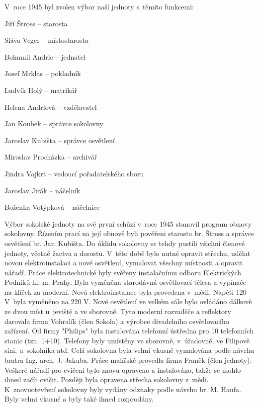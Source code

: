 \documentclass[a5paper, 11pt, twoside]{article}
\begin{document}
\medskip
\noindent V~roce 1945 byl zvolen výbor naší jednoty s~těmito funkcemi:

\noindent Jiří Štross -- starosta

\noindent Sláva Veger -- místostarosta

\noindent Bohumil Andrle -- jednatel

\noindent Josef Mrklas -- pokladník

\noindent Ludvík Holý -- matrikář

\noindent Helena Andrlová -- vzdělavatel

\noindent Jan Koubek -- správce sokolovny

\noindent Jaroslav Kubišta -- správce osvětlení

\noindent Miroslav Procházka -- archivář

\noindent Jindra Vajkrt -- vedoucí pořadatelského sboru

\noindent Jaroslav Jirák -- náčelník

\noindent Boženka Votýpková -- náčelnice
\medskip

Výbor sokolské jednoty na své první schůzi v~roce 1945 stanovil program
obnovy sokolovny. Řízením prací na její obnově byli pověřeni starosta
br. Štross a správce osvětlení br. Jar. Kubišta. Do úklidu sokolovny se
tehdy pustili všichni členové jednoty, včetně žactva a dorostu. V~této
době bylo nutné opravit střechu, udělat novou elektroinstalaci a nové
osvětlení, vymalovat všechny místnosti a opravit nářadí. Práce
elektrotechnické byly svěřeny instalačnímu odboru Elektrických Podniků
hl. m. Prahy. Byla vyměněna starodávná osvětlovací tělesa a vypínače na
klíček za moderní. Nová elektroinstalace byla provedena v~mědi. Napětí
120 V~byla vyměněno na 220 V. Nové osvětlení ve velkém sále bylo
ovládáno dálkově ze dvou míst u~jeviště a ve sborovně. Tyto moderní
rozvaděče a reflektory darovala firma Vohralík (člen Sokola) a výrobce
divadelního osvětlovacího zařízení. Od firmy "Philips" byla instalována
telefonní ústředna pro 10 telefonních stanic (tzn. 1+10). Telefony byly
umístěny ve sborovně, v~úřadovně, ve Filipově síni, u~sokolníka atd.
Celá sokolovna byla velmi vkusně vymalována podle návrhu bratra Ing.
arch. J. Jakuba. Práce malířské provedla firma Franěk (člen jednoty).
Veškeré nářadí pro cvičení bylo znovu opraveno a instalováno, takže se
mohlo ihned začít cvičit. Později byla opravena střecha sokolovny
z~mědi. K~znovuotevření sokolovny byly vydány odznaky podle návrhu br. M.
Haufa. Byly velmi vkusné a byly také ihned rozprodány.
\end{document}
